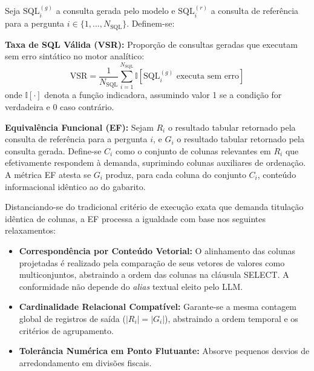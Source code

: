 \documentclass[12pt]{article}
\begin{document}
Seja $\text{SQL}_i^{(g)}$ a consulta gerada pelo modelo e $\text{SQL}_i^{(r)}$ a consulta de referência para a pergunta $i \in \{1,\dots,N_{\text{SQL}}\}$. Definem-se:

\textbf{Taxa de SQL Válida (VSR):} Proporção de consultas geradas que executam sem erro sintático no motor analítico:
\begin{equation}
\text{VSR} = \frac{1}{N_{\text{SQL}}} \sum_{i=1}^{N_{\text{SQL}}} \mathbb{I}\!\left[\text{SQL}_i^{(g)} \text{ executa sem erro}\right]
\end{equation}
onde $\mathbb{I}[\cdot]$ denota a função indicadora, assumindo valor 1 se a condição for verdadeira e 0 caso contrário.

\textbf{Equivalência Funcional (EF):} Sejam $R_i$ o resultado tabular retornado pela consulta de referência para a pergunta $i$, e $G_i$ o resultado tabular retornado pela consulta gerada. Define-se $C_i$ como o conjunto de colunas relevantes em $R_i$ que efetivamente respondem à demanda, suprimindo colunas auxiliares de ordenação. A métrica EF atesta se $G_i$ produz, para cada coluna do conjunto $C_i$, conteúdo informacional idêntico ao do gabarito.

Distanciando-se do tradicional critério de execução exata que demanda titulação idêntica de colunas, a EF processa a igualdade com base nos seguintes relaxamentos:
\begin{itemize}
    \item \textbf{Correspondência por Conteúdo Vetorial:} O alinhamento das colunas projetadas é realizado pela comparação de seus vetores de valores como multiconjuntos, abstraindo a ordem das colunas na cláusula SELECT. A conformidade não depende do \textit{alias} textual eleito pelo LLM.
    \item \textbf{Cardinalidade Relacional Compatível:} Garante-se a mesma contagem global de registros de saída ($|R_i| = |G_i|$), abstraindo a ordem temporal e os critérios de agrupamento.
    \item \textbf{Tolerância Numérica em Ponto Flutuante:} Absorve pequenos desvios de arredondamento em divisões fiscais.
\end{itemize}
\end{document}
